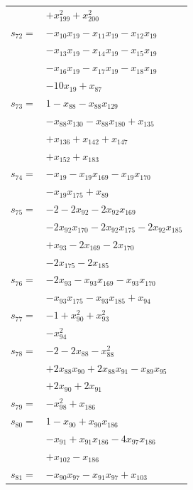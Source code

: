 \begin{longtable}{@{}r@{\;}l@{}}
 & \(\displaystyle +x_{199}^{2} +x_{200}^{2}\) \\[3pt]
\(s_{72}=\) & \(\displaystyle -x_{10}x_{19} -x_{11}x_{19} -x_{12}x_{19}\) \\
 & \(\displaystyle -x_{13}x_{19} -x_{14}x_{19} -x_{15}x_{19}\) \\
 & \(\displaystyle -x_{16}x_{19} -x_{17}x_{19} -x_{18}x_{19}\) \\
 & \(\displaystyle -10x_{19} +x_{87}\) \\[3pt]
\(s_{73}=\) & \(\displaystyle 1 -x_{88} -x_{88}x_{129}\) \\
 & \(\displaystyle -x_{88}x_{130} -x_{88}x_{180} +x_{135}\) \\
 & \(\displaystyle +x_{136} +x_{142} +x_{147}\) \\
 & \(\displaystyle +x_{152} +x_{183}\) \\[3pt]
\(s_{74}=\) & \(\displaystyle -x_{19} -x_{19}x_{169} -x_{19}x_{170}\) \\
 & \(\displaystyle -x_{19}x_{175} +x_{89}\) \\[3pt]
\(s_{75}=\) & \(\displaystyle -2 -2x_{92} -2x_{92}x_{169}\) \\
 & \(\displaystyle -2x_{92}x_{170} -2x_{92}x_{175} -2x_{92}x_{185}\) \\
 & \(\displaystyle +x_{93} -2x_{169} -2x_{170}\) \\
 & \(\displaystyle -2x_{175} -2x_{185}\) \\[3pt]
\(s_{76}=\) & \(\displaystyle -2x_{93} -x_{93}x_{169} -x_{93}x_{170}\) \\
 & \(\displaystyle -x_{93}x_{175} -x_{93}x_{185} +x_{94}\) \\[3pt]
\(s_{77}=\) & \(\displaystyle -1 +x_{90}^{2} +x_{93}^{2}\) \\
 & \(\displaystyle -x_{94}^{2}\) \\[3pt]
\(s_{78}=\) & \(\displaystyle -2 -2x_{88} -x_{88}^{2}\) \\
 & \(\displaystyle +2x_{88}x_{90} +2x_{88}x_{91} -x_{89}x_{95}\) \\
 & \(\displaystyle +2x_{90} +2x_{91}\) \\[3pt]
\(s_{79}=\) & \(\displaystyle -x_{98}^{2} +x_{186}\) \\[3pt]
\(s_{80}=\) & \(\displaystyle 1 -x_{90} +x_{90}x_{186}\) \\
 & \(\displaystyle -x_{91} +x_{91}x_{186} -4x_{97}x_{186}\) \\
 & \(\displaystyle +x_{102} -x_{186}\) \\[3pt]
\(s_{81}=\) & \(\displaystyle -x_{90}x_{97} -x_{91}x_{97} +x_{103}\) \\[3pt]

\end{longtable}
